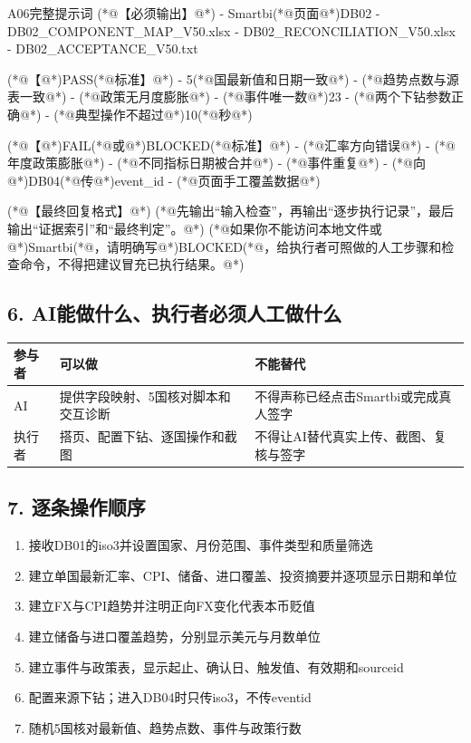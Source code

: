 \documentclass[UTF8,openany,zihao=-4]{ctexbook}
\renewcommand{\_}{\textunderscore\allowbreak}
\begin{document}
\begin{PromptBox}{A06完整提示词}
(*@{\promptcjk 【必须输出】}@*)
- Smartbi(*@{\promptcjk 页面}@*)DB02
- DB02_COMPONENT_MAP_V50.xlsx
- DB02_RECONCILIATION_V50.xlsx
- DB02_ACCEPTANCE_V50.txt

(*@{\promptcjk 【}@*)PASS(*@{\promptcjk 标准】}@*)
- 5(*@{\promptcjk 国最新值和日期一致}@*)
- (*@{\promptcjk 趋势点数与源表一致}@*)
- (*@{\promptcjk 政策无月度膨胀}@*)
- (*@{\promptcjk 事件唯一数}@*)23
- (*@{\promptcjk 两个下钻参数正确}@*)
- (*@{\promptcjk 典型操作不超过}@*)10(*@{\promptcjk 秒}@*)

(*@{\promptcjk 【}@*)FAIL(*@{\promptcjk 或}@*)BLOCKED(*@{\promptcjk 标准】}@*)
- (*@{\promptcjk 汇率方向错误}@*)
- (*@{\promptcjk 年度政策膨胀}@*)
- (*@{\promptcjk 不同指标日期被合并}@*)
- (*@{\promptcjk 事件重复}@*)
- (*@{\promptcjk 向}@*)DB04(*@{\promptcjk 传}@*)event_id
- (*@{\promptcjk 页面手工覆盖数据}@*)

(*@{\promptcjk 【最终回复格式】}@*)
(*@{\promptcjk 先输出“输入检查”，再输出“逐步执行记录”，最后输出“证据索引”和“最终判定”。}@*)
(*@{\promptcjk 如果你不能访问本地文件或}@*)Smartbi(*@{\promptcjk ，请明确写}@*)BLOCKED(*@{\promptcjk ，给执行者可照做的人工步骤和检查命令，不得把建议冒充已执行结果。}@*)
\end{PromptBox}

\subsection*{6. AI能做什么、执行者必须人工做什么}
\noindent\begin{tabularx}{\textwidth}{@{}p{}XX@{}}
\toprule
\textbf{参与者} & \textbf{可以做} & \textbf{不能替代} \\
\midrule
AI & 提供字段映射、5国核对脚本和交互诊断 & 不得声称已经点击Smartbi或完成真人签字 \\
执行者 & 搭页、配置下钻、逐国操作和截图 & 不得让AI替代真实上传、截图、复核与签字 \\
\bottomrule
\end{tabularx}

\subsection*{7. 逐条操作顺序}
\begin{enumerate}
\item 接收DB01的iso3并设置国家、月份范围、事件类型和质量筛选
\item 建立单国最新汇率、CPI、储备、进口覆盖、投资摘要并逐项显示日期和单位
\item 建立FX与CPI趋势并注明正向FX变化代表本币贬值
\item 建立储备与进口覆盖趋势，分别显示美元与月数单位
\item 建立事件与政策表，显示起止、确认日、触发值、有效期和source\_id
\item 配置来源下钻；进入DB04时只传iso3，不传event\_id
\item 随机5国核对最新值、趋势点数、事件与政策行数
\end{enumerate}
\end{document}

